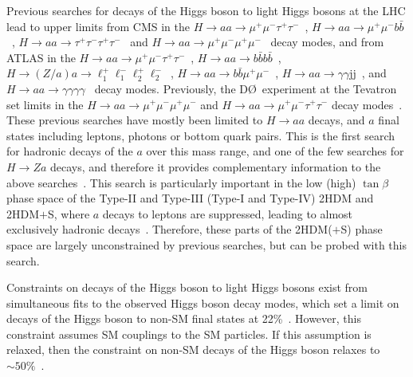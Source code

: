 \documentclass[NOTE, atlasdraft=true, texlive=2017, UKenglish]{\ATLASLATEXPATH atlasdoc}
\begin{document}
Previous searches for decays of the Higgs boson to light Higgs bosons at the LHC lead to upper limits from CMS in the $H\to aa\to \mu^+\mu^-\tau^+\tau^-$~\cite{CMSa0Limitmumutautau}, $H\to aa\to \mu^+\mu^-b\bar b$~\cite{CMSa0Limitmumubb}, $H\to aa\to \tau^+\tau^-\tau^+\tau^-$~\cite{CMSa0Limittautautautau1,CMSa0Limittautautautau2} and $H\to aa\to \mu^+\mu^-\mu^+\mu^-$~\cite{CMSa0Limitmumumumu} decay modes, and from ATLAS in the $H\to aa\to \mu^+\mu^-\tau^+\tau^-$~\cite{ATLASa0Limitmumutautau}, $H\to aa\to b\bar b b\bar b$~\cite{Aaboud:2016oyb}, $H\to (Z/a)a\to \ell_1^+\ell_1^-\ell_2^+\ell_2^-$~\cite{Aaboud:2018fvk}, $H\to aa\to b\bar b\mu^+\mu^-$~\cite{Aaboud:2018esj}, $H\to aa\to \gamma\gamma \text{jj}$~\cite{Aaboud:2018gmx}, and $H\to aa\to \gamma\gamma\gamma\gamma$~\cite{Aad:2015bua} decay modes. Previously, the D\O~experiment at the Tevatron set limits in the $H\to aa \to \mu^+\mu^-\mu^+\mu^-$ and $H\to aa \rightarrow\mu^+\mu^-\tau^+\tau^-$ decay modes~\cite{Abazov:2009yi}. These previous searches have mostly been limited to $H\to aa$ decays, and $a$ final states including leptons, photons or bottom quark pairs. This is the first search for hadronic decays of the $a$ over this mass range, and one of the few searches for $H\to Za$ decays, and therefore it provides complementary information to the above searches~\cite{Chisholm:2016fzg}. This search is particularly important in the low (high) $\tan\beta$ phase space of the Type-II and Type-III (Type-I and Type-IV) 2HDM and 2HDM$+$S, where $a$ decays to leptons are suppressed, leading to almost exclusively hadronic decays~\cite{PhysRevD.90.075004}. Therefore, these parts of the 2HDM($+$S) phase space are largely unconstrained by previous searches, but can be probed with this search.

Constraints on decays of the Higgs boson to light Higgs bosons exist from simultaneous fits to the observed Higgs boson decay modes, which set a limit on decays of the Higgs boson to non-SM final states at 22\%~\cite{Falkowski:2013dza}. However, this constraint assumes SM couplings to the SM particles. If this assumption is relaxed, then the constraint on non-SM decays of the Higgs boson relaxes to $\sim 50\%$~\cite{Falkowski:2013dza}.


\end{document}
